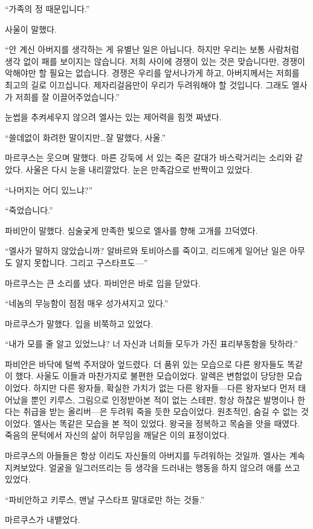 ``가족의 정 때문입니다.''

사울이 말했다.

``안 계신 아버지를 생각하는 게 유별난 일은 아닙니다. 하지만 우리는 보통 사람처럼 생각 없이 패를 보이지는 않습니다. 저희 사이에 경쟁이 있는 것은 맞습니다만, 경쟁이 악해야만 할 필요는 없습니다. 경쟁은 우리를 앞서나가게 하고, 아버지께서는 저희를 최고의 길로 이끄십니다. 제자리걸음만이 우리가 두려워해야 할 것입니다. 그래도 엘사가 저희를 잘 이끌어주었습니다.''

눈썹을 추켜세우지 않으려 엘사는 있는 제어력을 힘껏 짜냈다.

``쓸데없이 화려한 말이지만\ldots 잘 말했다, 사울.''

마르쿠스는 웃으며 말했다. 마른 강둑에 서 있는 죽은 갈대가 바스락거리는 소리와 같았다. 사울은 다시 눈을 내리깔았다. 눈은 만족감으로 반짝이고 있었다.

``나머지는 어디 있느냐?''

``죽었습니다.''

파비안이 말했다. 심술궂게 만족한 빛으로 엘사를 향해 고개를 끄덕였다.

``엘사가 말하지 않았습니까? 알바르와 토비아스를 죽이고, 리드에게 일어난 일은 아무도 알지 못합니다. 그리고 구스타프도—''

마르쿠스는 큰 소리를 냈다. 파비안은 바로 입을 닫았다.

``네놈의 무능함이 점점 매우 성가셔지고 있다.''

마르쿠스가 말했다. 입을 비쭉하고 있었다.

``내가 모를 줄 알고 있었느냐? 너 자신과 너희들 모두가 가진 표리부동함을 탓하라.''

파비안은 바닥에 털썩 주저앉아 엎드렸다. 더 품위 있는 모습으로 다른 왕자들도 똑같이 했다. 사울도 이들과 마찬가지로 불편한 모습이었다. 알렉은 변함없이 당당한 모습이었다. 하지만 다른 왕자들, 확실한 가치가 없는 다른 왕자들—다른 왕자보다 먼저 태어났을 뿐인 키루스, 그림으로 인정받아본 적이 없는 스테판, 항상 하찮은 발명이나 한다는 취급을 받는 올리버—은 두려워 죽을 듯한 모습이었다. 원초적인, 숨길 수 없는 것이었다. 엘사는 똑같은 모습을 본 적이 있었다. 왕국을 정복하고 목숨을 앗을 때였다. 죽음의 문턱에서 자신의 삶이 허무임을 깨달은 이의 표정이었다.

마르쿠스의 아들들은 항상 이리도 자신들의 아버지를 두려워하는 것일까. 엘사는 계속 지켜보았다. 얼굴을 일그러뜨리는 등 생각을 드러내는 행동을 하지 않으려 애를 쓰고 있었다.

``파비안하고 키루스, 맨날 구스타프 말대로만 하는 것들.''

마르쿠스가 내뱉었다.

